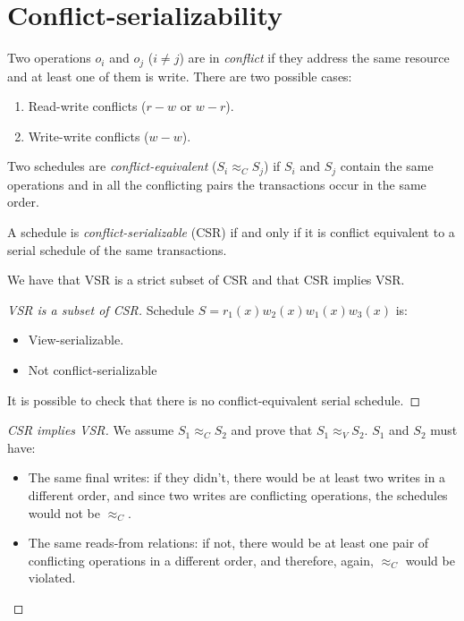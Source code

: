 \documentclass[12pt, a4paper]{report}
\newtheorem[style=M,bodystyle=\normalfont]{theorem}{Theorem}
\newtheorem[style=M,bodystyle=\normalfont]{corollary}{Corollary}
\newtheorem[style=M,bodystyle=\normalfont]{lemma}{Lemma}
\newtheorem[style=M,bodystyle=\normalfont]{definition}{Definition}
\begin{document}
    \section{Conflict-serializability}
    \begin{definition}
        Two operations $o_i$ and $o_j$ ($i \neq j$) are in \emph{conflict} if they address the same resource and at least one of them is write. There are two possible cases:
        \begin{enumerate}
            \item Read-write conflicts ($r-w$ or $w-r$).
            \item Write-write conflicts ($w-w$).
        \end{enumerate}

        Two schedules are \emph{conflict-equivalent} ($S_i \approx_C S_j$) if $S_i$ and $S_j$ contain the same operations and in all the conflicting pairs the transactions occur 
        in the same order. 

        A schedule is \emph{conflict-serializable} (CSR) if and only if it is conflict equivalent to a serial schedule of the same transactions. 
    \end{definition}
    We have that VSR is a strict subset of CSR and that CSR implies VSR. 
    \begin{proof}[VSR is a subset of CSR]
        Schedule $S = r_1(x) w_2(x) w_1(x) w_3(x)$ is: 
        \begin{itemize}
            \item View-serializable.
            \item Not conflict-serializable
        \end{itemize}
        It is possible to check that there is no conflict-equivalent serial schedule.
    \end{proof}
    \begin{proof}[CSR implies VSR]
        We assume $S_1 \approx_C S_2$ and prove that $S_1 \approx_V S_2$. $S_1$ and $S_2$ must have: 
        \begin{itemize}
            \item The same final writes: if they didn't, there would be at least two writes in a different order, and since two
                writes are conflicting operations, the schedules would not be $\approx_C$. 
            \item The same reads-from relations: if not, there would be at least one pair of conflicting operations in a different
                order, and therefore, again, $\approx_C$ would be violated. 
        \end{itemize}
    \end{proof}
\end{document}
